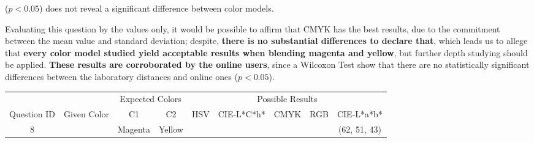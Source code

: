 ($p < 0.05$) does not reveal a significant difference between color models. \par
%
Evaluating this question by the values only, it would be possible to affirm that CMYK has the best results, due to the commitment between the mean value and standard deviation; despite,
\textbf{there is no substantial differences to declare that}, which leads us to allege that \textbf{every color model studied yield acceptable results when blending magenta and yellow},
but further depth studying should be applied. \textbf{These results are corroborated by the online users}, since a Wilcoxon Test show that there are no statistically significant differences
between the laboratory distances and online ones ($p < 0.05$).
%
\begin{table}[H]
  \resizebox{\textwidth}{!} {
  \begin{tabular}{lccccccccccccc}
    \hline
    \multicolumn{1}{c}{}                              &                                      & \multicolumn{2}{c}{Expected Colors}                   & \multicolumn{10}{c}{Possible Results}                                                                                                                                                                                                                                                                                        \\ \cline{3-14}
    \multicolumn{1}{c}{\multirow{-2}{*}{Question ID}} & \multirow{-2}{*}{Given Color}        & C1                       & C2                         & \multicolumn{2}{c}{HSV}                                        & \multicolumn{2}{c}{CIE-L*C*h*}                                 & \multicolumn{2}{c}{CMYK}                                       & \multicolumn{2}{c}{RGB}                                        & \multicolumn{2}{c}{CIE-L*a*b*}                                 \\ \hline
    \multicolumn{1}{c}{8}                             & \cellcolor[HTML]{FF0000}{\color[HTML]{FFFFFF}(41, 21, 2)} & \multicolumn{1}{c|}{Magenta} & \multicolumn{1}{c|}{Yellow}  & \multicolumn{2}{c|}{\cellcolor[HTML]{FF0000}{\color[HTML]{FFFFFF}(41, 21, 2)}}      & \multicolumn{2}{c|}{\cellcolor[HTML]{FF6755}{\color[HTML]{FFFFFF}(48, 32, 12)}}       & \multicolumn{2}{c|}{\cellcolor[HTML]{FF8080}{\color[HTML]{FFFFFF}(53, 38, 25)}}       & \multicolumn{2}{c|}{\cellcolor[HTML]{FF8080}{\color[HTML]{FFFFFF}(53, 38, 25)}}       & \multicolumn{2}{c|}{\cellcolor[HTML]{FFA6A6}(62, 51, 43)}       \\ \hline

\end{tabular}}
\end{table}
